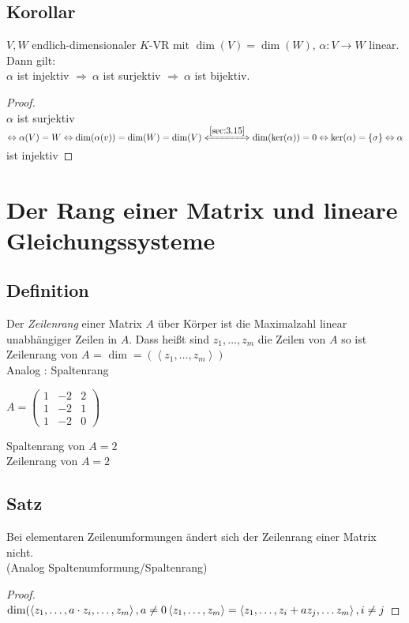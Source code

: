 \subsection{Korollar}\label{sec:3.16}
$V,W$ endlich-dimensionaler $K$-VR mit $\dim(V) = \dim(W),\, \alpha : V \to W$ linear. Dann gilt:\\
$\alpha$ ist injektiv $\Rightarrow\ \alpha$ ist surjektiv $\Rightarrow\ \alpha$ ist bijektiv.
\begin{proof}\ \\
$\alpha$ ist surjektiv $\Leftrightarrow \alpha(V) =W\\
 \Leftrightarrow \dim(\alpha(v) ) = \dim(W) = \dim(V)\\
\xLeftrightarrow{\ref{sec:3.15}} \dim(\ker(\alpha)) = 0 \Leftrightarrow \ker(\alpha) = \{ \sigma \} \Leftrightarrow \alpha$ ist injektiv
\end{proof}
\section{Der Rang einer Matrix und lineare Gleichungssysteme}
\subsection{Definition}\label{sec:\thesubsection}
Der \emph{Zeilenrang} einer Matrix $A$ über Körper ist die Maximalzahl linear unabhängiger Zeilen in $A$. Dass hei\ss t sind $z_1,\ldots,z_m$ die Zeilen von $A$ so ist Zeilenrang von $A$ = $\dim = (\left\langle z_1,\ldots,z_m\right\rangle)$\\
Analog : Spaltenrang\medskip\\
\begin{minipage}{.5\textwidth}
$A = \begin{pmatrix}
1&-2&2\\
1&-2&1\\
1&-2&0
\end{pmatrix}$ 
\end{minipage}%
\begin{minipage}{.5\textwidth}
Spaltenrang von $A = 2$\\
Zeilenrang von $A = 2$
\end{minipage}
\subsection{Satz}\label{sec:\thesubsection}
Bei elementaren Zeilenumformungen ändert sich der Zeilenrang einer Matrix nicht.\\ (Analog Spaltenumformung/Spaltenrang)\\
\begin{proof}$\dim(\left\langle z_1,\ldots,a \cdot z_i,\ldots,z_m\right\rangle, a \ne 0\\
\left\langle z_1,\ldots,z_m \right\rangle = \left\langle z_1,\ldots,z_i+az_j,\ldots z_m\right\rangle, i \ne j$
\end{proof}
